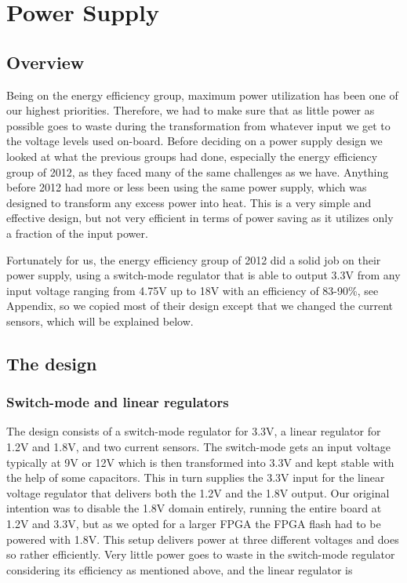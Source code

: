 \section{Power Supply}
\subsection{Overview}
Being on the energy efficiency group, maximum power utilization has been one of
our highest priorities. Therefore, we had to make sure that as little power as
possible goes to waste during the transformation from whatever input we get to
the voltage levels used on-board. Before deciding on a power supply design we
looked at what the previous groups had done, especially the energy efficiency
group of 2012, as they faced many of the same challenges as we have. Anything
before 2012 had more or less been using the same power supply, which was
designed to transform any excess power into heat. This is a very simple and
effective design, but not very efficient in terms of power saving as it utilizes
only a fraction of the input power.

Fortunately for us, the energy efficiency group of 2012 did a solid job on their
power supply, using a switch-mode regulator that is able to output 3.3V from
any input voltage ranging from 4.75V up to 18V with an efficiency of 83-90\%, see
Appendix, so we copied most of their design except that we changed the current sensors, which will be explained below.

\subsection{The design}
\subsubsection{Switch-mode and linear regulators}
The design consists of a switch-mode regulator for 3.3V, a linear regulator for 1.2V and 1.8V, and two current sensors. The switch-mode gets an input voltage typically at 9V or 12V which is then transformed into 3.3V and kept stable with the help of some capacitors. This in turn supplies the 3.3V input for the linear voltage regulator that delivers both the 1.2V and the 1.8V output. Our original intention was to disable the 1.8V domain entirely, running the entire board at 1.2V and 3.3V, but as we opted for a larger FPGA the FPGA flash had to be powered with 1.8V. This setup delivers power at three different voltages and does so rather efficiently. Very little power goes to waste in the switch-mode regulator considering its efficiency as mentioned above, and the linear regulator is 

